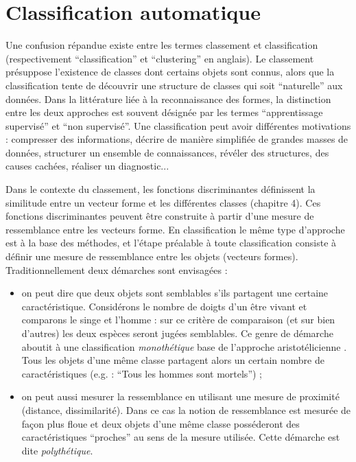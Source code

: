 \chapter{Classification automatique}

Une confusion r\'epandue existe entre les termes classement
et classification (respectivement ``classification'' et ``clustering''  en anglais).
Le classement pr\'esuppose l'existence de classes dont certains objets
sont connus, alors que la
classification tente de d\'ecouvrir une structure de classes 
qui soit ``naturelle'' aux donn\'ees. Dans la litt\'erature li\'ee \`a
la reconnaissance des formes, la distinction entre les deux approches
est souvent d\'esign\'ee par les termes
``apprentissage supervis\'e'' et ``non supervis\'e''. Une classification peut 
avoir diff\'erentes motivations   : compresser des informations,
d\'ecrire de mani\`ere simplifi\'ee de grandes masses de donn\'ees,
structurer un ensemble de connaissances,
r\'ev\'eler des structures, des causes cach\'ees,
r\'ealiser un diagnostic...
 

Dans le contexte du classement, les fonctions discriminantes d\'efinissent
la similitude entre un vecteur forme et les diff\'erentes classes (chapitre 4).
Ces fonctions discriminantes peuvent \^etre construite \`a partir d'une
mesure de ressemblance entre les vecteurs forme. En classification le m\^eme
type d'approche  est \`a la base des m\'ethodes, et l'\'etape pr\'ealable
\`a toute classification consiste \`a d\'efinir une mesure
de  ressemblance entre les  objets (vecteurs formes). Traditionnellement
deux d\'emarches sont envisag\'ees :
\begin{itemize}
\item on peut dire que deux objets sont semblables s'ils  partagent une certaine
caract\'eristique. Consid\'erons le nombre de doigts d'un \^etre vivant et comparons
le singe et l'homme : sur ce crit\`ere de comparaison (et sur bien d'autres) les deux
esp\`eces seront jug\'ees semblables. Ce genre de d\'emarche aboutit \`a une classification
{\em monoth\'etique} base de l'approche aristot\'elicienne \cite{Sutcliffe1994}. Tous
les objets d'une m\^eme classe partagent alors un certain nombre de caract\'eristiques
(e.g. : ``Tous les hommes sont mortels'') ;   
\item on peut aussi mesurer la ressemblance en utilisant une mesure de proximit\'e (distance,
dissimilarit\'e). Dans ce cas la notion de ressemblance est mesur\'ee de fa\c{c}on plus
floue et deux objets d'une m\^eme classe poss\'ederont des caract\'eristiques ``proches''
au sens de la mesure utilis\'ee. Cette d\'emarche est dite {\em polyth\'etique}.
\end{itemize}

